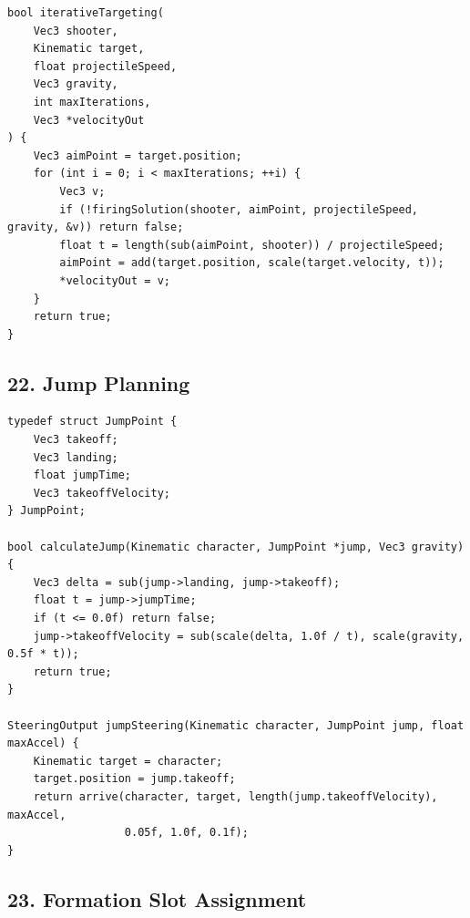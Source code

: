 \documentclass[10pt,letterpaper]{article}
\begin{document}
\begin{verbatim}
bool iterativeTargeting(
    Vec3 shooter,
    Kinematic target,
    float projectileSpeed,
    Vec3 gravity,
    int maxIterations,
    Vec3 *velocityOut
) {
    Vec3 aimPoint = target.position;
    for (int i = 0; i < maxIterations; ++i) {
        Vec3 v;
        if (!firingSolution(shooter, aimPoint, projectileSpeed, gravity, &v)) return false;
        float t = length(sub(aimPoint, shooter)) / projectileSpeed;
        aimPoint = add(target.position, scale(target.velocity, t));
        *velocityOut = v;
    }
    return true;
}
\end{verbatim}

\subsection*{22. Jump Planning}
{}

\begin{verbatim}
typedef struct JumpPoint {
    Vec3 takeoff;
    Vec3 landing;
    float jumpTime;
    Vec3 takeoffVelocity;
} JumpPoint;

bool calculateJump(Kinematic character, JumpPoint *jump, Vec3 gravity) {
    Vec3 delta = sub(jump->landing, jump->takeoff);
    float t = jump->jumpTime;
    if (t <= 0.0f) return false;
    jump->takeoffVelocity = sub(scale(delta, 1.0f / t), scale(gravity, 0.5f * t));
    return true;
}

SteeringOutput jumpSteering(Kinematic character, JumpPoint jump, float maxAccel) {
    Kinematic target = character;
    target.position = jump.takeoff;
    return arrive(character, target, length(jump.takeoffVelocity), maxAccel,
                  0.05f, 1.0f, 0.1f);
}
\end{verbatim}

\subsection*{23. Formation Slot Assignment}
{}
\end{document}
